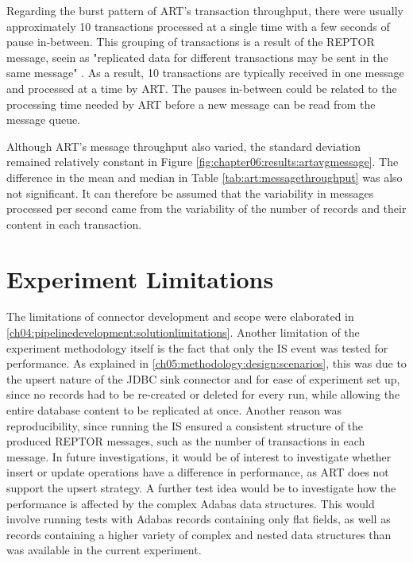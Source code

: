 Regarding the burst pattern of \ac{ART}'s transaction throughput, there were usually approximately 10 transactions processed at a single time with a few seconds of pause in-between. This grouping of transactions is a result of the \ac{REPTOR} message, seein as "replicated data for different transactions may be sent in the same message" \cite{reptorprogrammersref}. As a result, 10 transactions are typically received in one message and processed at a time by \ac{ART}. The pauses in-between could be related to the processing time needed by \ac{ART} before a new message can be read from the message queue. 

Although \ac{ART}'s message throughput also varied, the standard deviation remained relatively constant in Figure \ref{fig:chapter06:results:artavgmessage}. The difference in the mean and median in Table \ref{tab:art:messagethroughput} was also not significant. It can therefore be assumed that the variability in messages processed per second came from the variability of the number of records and their content in each transaction. 

\section{Experiment Limitations}
The limitations of connector development and scope were elaborated in \ref{ch04:pipelinedevelopment:solutionlimitations}. Another limitation of the experiment methodology itself is the fact that only the \ac{IS} event was tested for performance. As explained in \ref{ch05:methodology:design:scenarios}, this was due to the upsert nature of the \ac{JDBC} sink connector and for ease of experiment set up, since no records had to be re-created or deleted for every run, while allowing the entire database content to be replicated at once. Another reason was reproducibility, since running the \ac{IS} ensured a consistent structure of the produced \ac{REPTOR} messages, such as the number of transactions in each message. In future investigations, it would be of interest to investigate whether insert or update operations have a difference in performance, as \ac{ART} does not support the upsert strategy. A further test idea would be to investigate how the performance is affected by the complex Adabas data structures. This would involve running tests with Adabas records containing only flat fields, as well as records containing a higher variety of complex and nested data structures than was available in the current experiment.